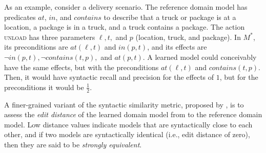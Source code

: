 \documentclass{article}
\theoremstyle{definition}
\theoremstyle{remark}
\newcommand{\realm}{{\ensuremath{M^*}}\xspace}
\newif\ifaddcomments
\newcommand{\roni}[1]{\ifaddcomments{\textcolor{red}{[Roni: #1]}}\fi}
\newcommand{\gregor}[1]{\ifaddcomments{\textcolor{orange}{[Gregor: #1]}}\fi}
\begin{document}
As an example, consider a delivery scenario.
The reference domain model has predicates $at$, $in$, and $contains$ to describe that a truck or package is at a location, a package is in a truck, and a truck contains a package.
The action \textsc{unload} has three parameters $\ell, t,$ and $p$ (location, truck, and package).
In $\realm$, its preconditions are $\textit{at}(\ell, t)$ and $\textit{in}(p,t)$, and its effects are $\neg \textit{in}(p,t), \neg \textit{contains}(t,p),$ and $\textit{at}(p,t)$.
A learned model could conceivably have the same effects, but with the preconditions $\textit{at}(\ell, t)$ and $\textit{contains}(t,p)$.
Then, it would have syntactic recall and precision for the effects of $1$, but for the preconditions it would be $\frac 1 2$.

A finer-grained variant of the syntactic similarity metric, proposed by \cite{chrpa2023comparing}, is to assess the \emph{edit distance} of the learned domain model from to the reference domain model. Low distance values indicate models that are syntactically close to each other, and if two models are syntactically identical (i.e., edit distance of zero), then they are said to be \textit{strongly equivalent}.







\end{document}

